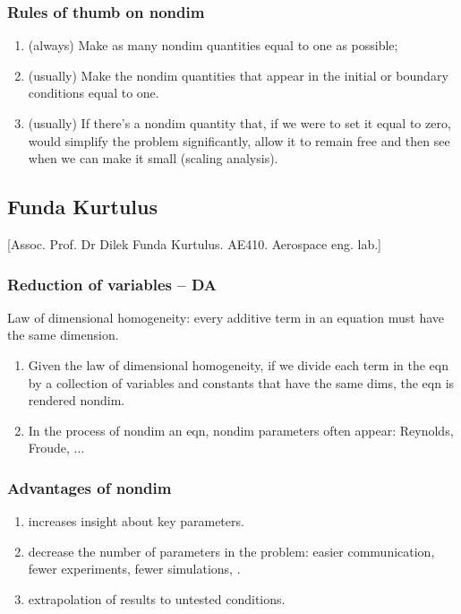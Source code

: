 \subsubsection{Rules of thumb on nondim}
\begin{enumerate}
\item (always) Make as many nondim quantities equal to one as possible;
\item (usually) Make the nondim quantities that appear in the initial or boundary conditions equal to one.
\item (usually) If there's a nondim quantity that, if we were to set it equal to zero, would simplify the problem significantly, allow it to remain free and then see when we can make it small (scaling analysis).
\end{enumerate}


\subsection{Funda Kurtulus}
[Assoc. Prof. Dr Dilek Funda Kurtulus. AE410. Aerospace eng. lab.]


\subsubsection{Reduction of variables -- DA}

Law of dimensional homogeneity: every additive term in an equation must have the same dimension. 

\begin{enumerate}
%
\item Given  the law of dimensional homogeneity, if we divide each term in the eqn by a collection of variables and constants that have the same dims, the eqn is rendered nondim.
%
\item In the process of nondim an eqn, nondim parameters often appear: Reynolds, Froude, ...
%
\end{enumerate}

\subsubsection{Advantages of nondim}
\begin{enumerate}
%
\item increases insight about key parameters.
%
\item decrease the number of parameters in the problem: easier communication, fewer experiments, fewer simulations, \etc.
%
\item extrapolation of results to untested conditions.
%
\end{enumerate}


